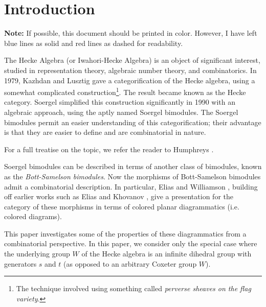 
\section{Introduction}
\textbf{Note:} If possible, this document should be printed in color.  However, I have left blue lines as solid and red lines as dashed for readability.

The Hecke Algebra (or Iwahori-Hecke Algebra) is an object of significant interest, studied in representation theory, algebraic number theory, and combinatorics.  In 1979, Kazhdan and Lusztig \cite{ref:KaLu1,ref:KaLu2} gave a categorification of the Hecke algebra, using a somewhat complicated construction\footnote{The technique involved using something called \emph{perverse sheaves on the flag variety}.}.  The result became known as the Hecke category.
Soergel \cite{ref:Soe1,ref:Soe2} simplified this construction significantly in 1990 with an algebraic approach, using the aptly named Soergel bimodules.  The Soergel bimodules permit an easier understanding of this categorification; their advantage is that they are easier to define and are combinatorial in nature.

For a full treatise on the topic, we refer the reader to Humphreys \cite{ref:Humphreys}.

Soergel bimodules can be described in terms of another class of bimodules, known as the \emph{Bott-Samelson bimodules}.
Now the morphisms of Bott-Samelson bimodules admit a combinatorial description.  In particular, Elias and Williamson \cite{ref:gr4all}, building off earlier works such as Elias and Khovanov \cite{ref:EKh}, give a presentation for the category of these morphisms in terms of colored planar diagrammatics (i.e. colored diagrams). 

This paper investigates some of the properties of these diagrammatics from a combinatorial perspective.   In this paper, we consider only the special case where the underlying group $W$ of the Hecke algebra is an infinite dihedral group with generators $s$ and $t$ (as opposed to an arbitrary Coxeter group $W$).


